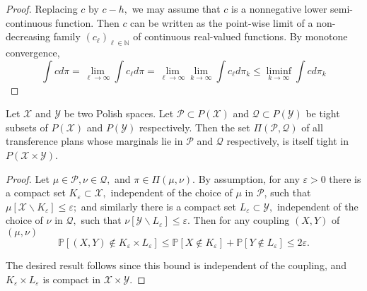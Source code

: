 \begin{proof}
 Replacing \( c \) by \( c - h , \) we may assume that \( c \) is a nonnegative lower semi-continuous function. Then \( c \) can be written as the point-wise limit of a non-decreasing family \( \left( c _ { \ell } \right) _ { \ell \in \mathbb { N } } \) of continuous real-valued functions. By monotone convergence,
	\[ \int c d \pi = \lim _ { \ell \rightarrow \infty } \int c _ { \ell } d \pi = \lim _ { \ell \rightarrow \infty } \lim _ { k \rightarrow \infty } \int c _ { \ell } d \pi _ { k } \leq \liminf _ { k \rightarrow \infty } \int c d \pi _ { k } \]
\end{proof}
\begin{lem}
	Let \( \mathcal { X } \) and \( \mathcal { Y } \) be two Polish spaces. Let \( \mathcal { P } \subset P ( \mathcal { X } ) \) and \( \mathcal { Q } \subset P ( \mathcal { Y } ) \) be tight subsets of \( P ( \mathcal { X } ) \) and \( P ( \mathcal { Y } ) \) respectively. Then the set \( \Pi ( \mathcal { P } , \mathcal { Q } ) \) of all transference plans whose marginals lie in \( \mathcal { P } \) and \( \mathcal { Q } \) respectively, is itself tight in \( P ( \mathcal { X } \times \mathcal { Y } ) \).
\end{lem}

\begin{proof}
 Let \( \mu \in \mathcal { P } , \nu \in \mathcal { Q } , \) and \( \pi \in \Pi ( \mu , \nu ) . \) By assumption, for any \( \varepsilon > 0 \) there is a compact set \( K _ { \varepsilon } \subset \mathcal { X } , \) independent of the choice of \( \mu \) in \( \mathcal { P } \), such that \( \mu \left[ \mathcal { X } \backslash K _ { \varepsilon } \right] \leq \varepsilon ; \) and similarly there is a compact set \( L _ { \varepsilon } \subset \mathcal { Y } , \) independent of the choice of \( \nu \) in \( \mathcal { Q } , \) such that \( \nu \left[ \mathcal { Y } \backslash L _ { \varepsilon } \right] \leq \varepsilon . \) Then for any coupling \( ( X , Y ) \) of \( ( \mu , \nu ) \)
	\[ \mathbb { P } \left[ ( X , Y ) \notin K _ { \varepsilon } \times L _ { \varepsilon } \right] \leq \mathbb { P } \left[ X \notin K _ { \varepsilon } \right] + \mathbb { P } \left[ Y \notin L _ { \varepsilon } \right] \leq 2 \varepsilon. \]

	The desired result follows since this bound is independent of the coupling, and \( K _ { \varepsilon } \times L _ { \varepsilon } \) is compact in \( \mathcal { X } \times \mathcal { Y }  \).
\end{proof}

